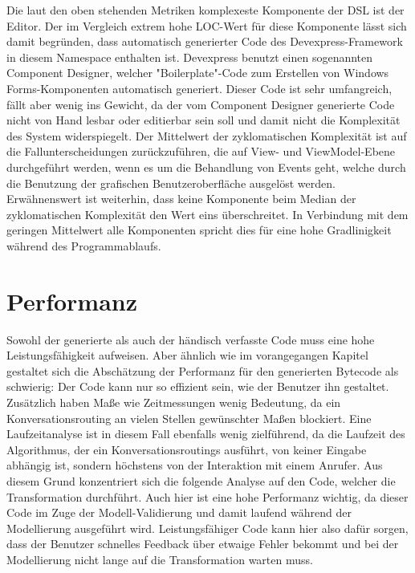 \newline
Die laut den oben stehenden Metriken komplexeste Komponente der DSL ist der Editor. Der im Vergleich extrem hohe LOC-Wert für diese Komponente lässt sich damit begründen, dass automatisch generierter Code des Devexpress-Framework in diesem Namespace enthalten ist. Devexpress benutzt einen sogenannten Component Designer, welcher "Boilerplate"-Code zum Erstellen von Windows Forms-Komponenten automatisch generiert. Dieser Code ist sehr umfangreich, fällt aber wenig ins Gewicht, da der vom Component Designer generierte Code nicht von Hand lesbar oder editierbar sein soll und damit nicht die Komplexität des System widerspiegelt. Der Mittelwert der zyklomatischen Komplexität ist auf die Fallunterscheidungen zurückzuführen, die auf View- und ViewModel-Ebene durchgeführt werden, wenn es um die Behandlung von Events geht, welche durch die Benutzung der grafischen Benutzeroberfläche ausgelöst werden.
\newline
Erwähnenswert ist weiterhin, dass keine Komponente beim Median der zyklomatischen Komplexität den Wert eins überschreitet. In Verbindung mit dem geringen Mittelwert alle Komponenten spricht dies für eine hohe Gradlinigkeit während des Programmablaufs. 

\section{Performanz}
Sowohl der generierte als auch der händisch verfasste Code muss eine hohe Leistungsfähigkeit aufweisen. Aber ähnlich wie im vorangegangen Kapitel gestaltet sich die Abschätzung der Performanz für den generierten Bytecode als schwierig: Der Code kann nur so effizient sein, wie der Benutzer ihn gestaltet. Zusätzlich haben Maße wie Zeitmessungen wenig Bedeutung, da ein Konversationsrouting an vielen Stellen gewünschter Maßen blockiert. Eine Laufzeitanalyse ist in diesem Fall ebenfalls wenig zielführend, da die Laufzeit des Algorithmus, der ein Konversationsroutings ausführt, von keiner Eingabe abhängig ist, sondern höchstens von der Interaktion mit einem Anrufer.
\newline
Aus diesem Grund konzentriert sich die folgende Analyse auf den Code, welcher die Transformation durchführt. Auch hier ist eine hohe Performanz wichtig, da dieser Code im Zuge der Modell-Validierung und damit laufend während der Modellierung ausgeführt wird. Leistungsfähiger Code kann hier also dafür sorgen, dass der Benutzer schnelles Feedback über etwaige Fehler bekommt und bei der Modellierung nicht lange auf die Transformation warten muss.

